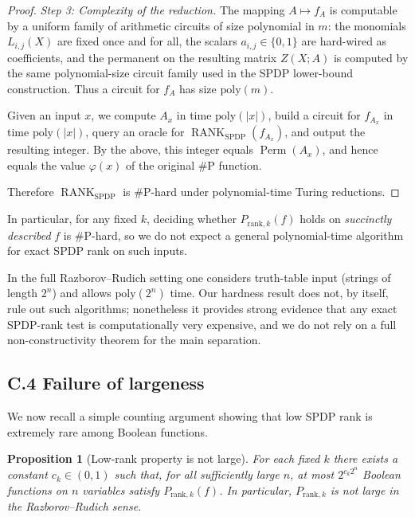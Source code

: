 \documentclass[12pt]{article}
\DeclareMathOperator{\Perm}{Perm}
\DeclareMathOperator{\RANK}{RANK}
\newtheorem{proposition}[theorem]{Proposition}
\theoremstyle{definition}
\theoremstyle{definition}
\theoremstyle{remark}
\theoremstyle{remark}
\begin{document}
\begin{proof}
\medskip\noindent
\emph{Step 3: Complexity of the reduction.}
The mapping $A \mapsto f_A$ is computable by a uniform family of arithmetic circuits
of size polynomial in $m$: the monomials $L_{i,j}(X)$ are fixed once and for all, the
scalars $a_{i,j} \in \{0,1\}$ are hard-wired as coefficients, and the permanent on the
resulting matrix $Z(X;A)$ is computed by the same polynomial-size circuit family used
in the SPDP lower-bound construction. Thus a circuit for $f_A$ has size $\mathrm{poly}(m)$.

Given an input $x$, we compute $A_x$ in time $\mathrm{poly}(|x|)$, build a circuit
for $f_{A_x}$ in time $\mathrm{poly}(|x|)$, query an oracle for
$\RANK_{\mathrm{SPDP}}(f_{A_x})$, and output the resulting integer. By the above,
this integer equals $\Perm(A_x)$, and hence equals the value $\varphi(x)$ of the original
\#P function.

Therefore $\RANK_{\mathrm{SPDP}}$ is \#P-hard under polynomial-time Turing
reductions.
\end{proof}

In particular, for any fixed $k$, deciding whether $P_{\mathrm{rank},k}(f)$ holds on
\emph{succinctly described} $f$ is \#P-hard, so we do not expect a general polynomial-time
algorithm for exact SPDP rank on such inputs.

In the full Razborov--Rudich setting one considers truth-table input (strings of length
$2^n$) and allows $\mathrm{poly}(2^n)$ time. Our hardness result does not, by itself, rule
out such algorithms; nonetheless it provides strong evidence that any exact SPDP-rank test
is computationally very expensive, and we do not rely on a full non-constructivity theorem
for the main separation.

\subsection*{C.4 Failure of largeness}

We now recall a simple counting argument showing that low SPDP rank is extremely rare
among Boolean functions.

\begin{proposition}[Low-rank property is not large]
\label{prop:low-rank-not-large}
For each fixed $k$ there exists a constant $c_k \in (0,1)$ such that, for all sufficiently
large $n$, at most $2^{c_k 2^n}$ Boolean functions on $n$ variables satisfy
$P_{\mathrm{rank},k}(f)$.
In particular, $P_{\mathrm{rank},k}$ is not large in the Razborov--Rudich sense.
\end{proposition}
\end{document}
